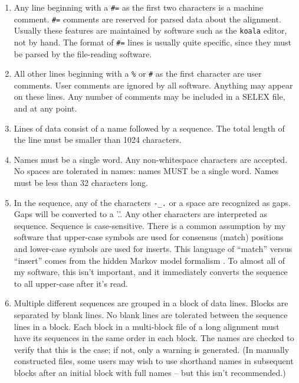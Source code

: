 \begin{enumerate}
\item
Any line beginning with a \verb+#=+ as the first two characters is a
machine comment.  \verb+#=+ comments are reserved for parsed data
about the alignment. Usually these features are maintained by software
such as the {\tt koala} editor, not by hand. The format of \verb+#=+
lines is usually quite specific, since they must be parsed by the
file-reading software.

\item
All other lines beginning with a \verb+%+ or \verb+#+ as the first
character are user comments.  User comments are ignored by all
software. Anything may appear on these lines. Any number of comments
may be included in a SELEX file, and at any point.

\item
Lines of data consist of a name followed by a sequence. The total
length of the line must be smaller than 1024 characters.

\item
Names must be a single word. Any non-whitespace characters are
accepted.  No spaces are tolerated in names: names MUST be a
single word. Names must be less than 32 characters long.

\item In the sequence, any of the characters \verb+-_.+ or a space are
recognized as gaps. Gaps will be converted to a '.'. Any other
characters are interpreted as sequence.  Sequence is
case-sensitive. There is a common assumption by my software that
upper-case symbols are used for consensus (match) positions and
lower-case symbols are used for inserts. This language of ``match''
versus ``insert'' comes from the hidden Markov model formalism
\cite{Krogh94}. To almost all of my software, this isn't important,
and it immediately converts the sequence to all upper-case after it's
read.

\item
Multiple different sequences are grouped in a block of data lines.
Blocks are separated by blank lines. No blank lines are tolerated
between the sequence lines in a block. Each block in a multi-block
file of a long alignment must have its sequences in the same order in
each block. The names are checked to verify that this is the case; if
not, only a warning is generated. (In manually constructed files, some
users may wish to use shorthand names in subsequent blocks after an
initial block with full names -- but this isn't recommended.)
\end{enumerate}

